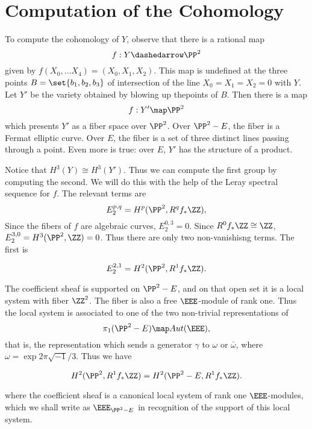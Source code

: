 


\section{Computation of the Cohomology}

To compute the cohomology of $Y$, observe that
there is a rational map
\[
   f: Y \dashedarrow \PP^2
\]
given by $f(X_0, \ldots X_4) = (X_0, X_1 , X_2)$.
This map is undefined at the three points
$B = \set{b_1, b_2, b_3}$ of intersection
of the line $X_0 = X_1 = X_2 = 0$ with $Y$.
Let $Y'$ be the variety obtained by blowing
up thepoints of $B$. Then there is a map
\[
   f: Y' \map \PP^2
\] which presents $Y'$ as a fiber space over
$\PP^2$. Over $\PP^2 - E$, the fiber is a
Fermat elliptic curve. Over $E$, the fiber
is a set of three distinct lines passing
through a point. Even more is true: over
$E$, $Y'$ has the structure of a product.


Notice that $H^3(Y) \cong H^3(Y')$. Thus we can compute the first group by computing
the second. We will do this with the help of the Leray spectral sequence for $f$. The
relevant terms are
\[
  E_2^{p,q} = H^p(\PP^2, R^qf_*\ZZ),
\]
Since the fibers of $f$ are
algebraic curves, $E_2^{0,3} = 0$. Since $R^0f_*\ZZ \cong \ZZ$,
$E_2^{3,0} = H^3(\PP^2, \ZZ) = 0$. Thus there are only two
non-vanishisng terms. The first is

\begin{equation}
\label{leray21} E_2^{2,1} = H^2(\PP^2, R^1f_*\ZZ).
\end{equation}

The coefficient sheaf
is supported on $\PP^2 - E$, and on that open set it is a local system with fiber
$\ZZ^2$. The fiber is also a free $\EEE$-module of rank one. Thus the local system is
associated to one of the two non-trivial representations of
\[
  \pi_1(\PP^2 - E) \map Aut(\EEE),
\]
that is, the representation which sends a generator $\gamma$ to $\omega$
or $\bar\omega$, where $\omega = \exp 2\pi \sqrt{-1}/3$. Thus we have

\begin{equation}
\label{eq:locsyscoh} H^2(\PP^2, R^1f_*\ZZ) = H^2(\PP^2 - E, R^1f_*\ZZ).
\end{equation}


where the coefficient sheaf is a canonical local system of rank one $\EEE$-modules,
which we shall write as $\EEE_{\PP^2 - E}$ in recognition of the support of this local
system.


